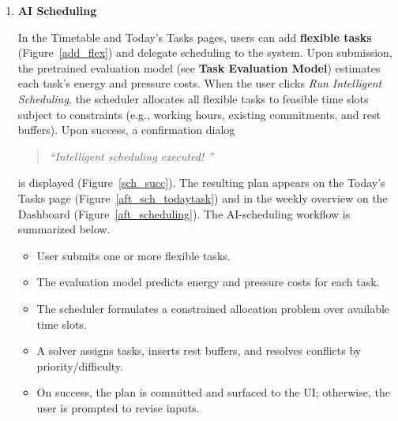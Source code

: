 \documentclass[12pt, a4paper]{article}
\begin{document}
\begin{enumerate}
                \item \textbf{AI Scheduling}

                    In the Timetable and Today’s Tasks pages, users can add \textbf{flexible tasks} (Figure~\ref{add_flex}) and delegate scheduling to the system. Upon submission, the pretrained evaluation model (see \textbf{Task Evaluation Model}) estimates each task’s energy and pressure costs. When the user clicks \emph{Run Intelligent Scheduling}, the scheduler allocates all flexible tasks to feasible time slots subject to constraints (e.g., working hours, existing commitments, and rest buffers). Upon success, a confirmation dialog 

                    \begin{quote}
                        \textit{“Intelligent scheduling executed! ”}
                    \end{quote}
                    
                    is displayed (Figure~\ref{sch_succ}). The resulting plan appears on the Today’s Tasks page (Figure~\ref{aft_sch_todaytask}) and in the weekly overview on the Dashboard (Figure~\ref{aft_scheduling}). The AI-scheduling workflow is summarized below.
                    
                    \begin{itemize}
                        \item User submits one or more flexible tasks.
                        \item The evaluation model predicts energy and pressure costs for each task.
                        \item The scheduler formulates a constrained allocation problem over available time slots.
                        \item A solver assigns tasks, inserts rest buffers, and resolves conflicts by priority/difficulty.
                        \item On success, the plan is committed and surfaced to the UI; otherwise, the user is prompted to revise inputs.
                    \end{itemize}



\end{enumerate}
\end{document}
